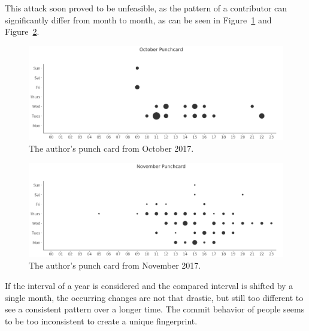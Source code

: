 This attack soon proved to be unfeasible, as the pattern of a contributor can significantly differ from month to month, as can be seen in Figure~\ref{fig:october-punchcard} and Figure~\ref{fig:november-punchcard}.

\begin{figure}[H]
    \includegraphics[scale=0.32]{./graphs/analysis/october-punchcard}
    \centering
    \caption{The author's punch card from October 2017.}\label{fig:october-punchcard}
\end{figure}

\begin{figure}[H]
    \includegraphics[scale=0.32]{./graphs/analysis/november-punchcard}
    \centering
    \caption{The author's punch card from November 2017.}\label{fig:november-punchcard}
\end{figure}

If the interval of a year is considered and the compared interval is shifted by a single month, the occurring changes are not that drastic, but still too different to see a consistent pattern over a longer time.
The commit behavior of people seems to be too inconsistent to create a unique fingerprint.
